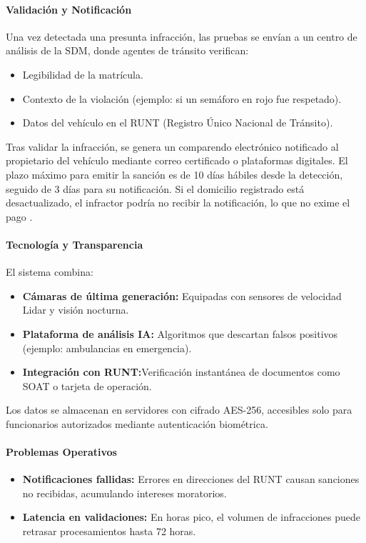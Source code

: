 \paragraph{Validación y Notificación }
Una vez detectada una presunta infracción, las pruebas se envían a un centro de análisis de la SDM, donde agentes de tránsito verifican:

\begin{itemize}
    \item Legibilidad de la matrícula. 
    \item Contexto de la violación (ejemplo: si un semáforo en rojo fue respetado).
    \item Datos del vehículo en el RUNT (Registro Único Nacional de Tránsito).
\end{itemize}

Tras validar la infracción, se genera un comparendo electrónico notificado al propietario del vehículo mediante correo certificado o plataformas digitales. El plazo máximo para emitir la sanción es de 10 días hábiles desde la detección, seguido de 3 días para su notificación. Si el domicilio registrado está desactualizado, el infractor podría no recibir la notificación, lo que no exime el pago \parencite{ley1843}. 

\paragraph{Tecnología y Transparencia }
El sistema combina: 
\begin{itemize}
    \item \textbf{Cámaras de última generación: }Equipadas con sensores de velocidad Lidar y visión nocturna. 
    \item \textbf{Plataforma de análisis IA: }Algoritmos que descartan falsos positivos (ejemplo: ambulancias en emergencia). 
        \item \textbf{Integración con RUNT:}Verificación instantánea de documentos como SOAT o tarjeta de operación.
\end{itemize}

Los datos se almacenan en servidores con cifrado AES-256, accesibles solo para funcionarios autorizados mediante autenticación biométrica.

\paragraph{Problemas Operativos }
\begin{itemize}
    \item \textbf{Notificaciones fallidas: }Errores en direcciones del RUNT causan sanciones no recibidas, acumulando intereses moratorios. 
    \item \textbf{Latencia en validaciones:  }En horas pico, el volumen de infracciones puede retrasar procesamientos hasta 72 horas.
\end{itemize}

